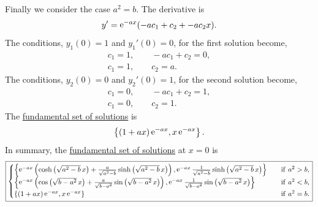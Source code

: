 \begin{Solution}
  Finally we consider the case $a^2 = b$.  The derivative is
  \[
  y' = \mathop{\mathrm{e}}\nolimits^{-a x} ( -a c_1 + c_2 + -a c_2 x ).
  \]
  The conditions, $y_1(0) = 1$ and $y_1'(0) = 0$, for the first solution become,
  \begin{gather*}
    c_1 = 1, \qquad -a c_1 + c_2 = 0, \\
    c_1 = 1, \qquad c_2 = a.
  \end{gather*}
  The conditions, $y_2(0) = 0$ and $y_2'(0) = 1$, for the second solution become,
  \begin{gather*}
    c_1 = 0, \qquad -a c_1 + c_2 = 1, \\
    c_1 = 0, \qquad c_2 = 1.
  \end{gather*}
  The 
  \hyperref[section The Fundamental Set of Solutions]
    {fundamental set of solutions}
  is
  \[
  \left\{
    (1 + a x) \mathop{\mathrm{e}}\nolimits^{-a x},
    x \mathop{\mathrm{e}}\nolimits^{-a x} 
  \right\}.
  \]
  In summary, the 
  \hyperref[section The Fundamental Set of Solutions]
    {fundamental set of solutions}
  at $x = 0$ is
  \[
  \boxed{
    \begin{cases}
      \left\{
        \mathop{\mathrm{e}}\nolimits^{-a x} \left( \cosh \left( \sqrt{a^2 - b}\, x \right) 
          + \frac{a}{\sqrt{a^2-b}} \sinh \left( \sqrt{a^2 - b}\, x \right)\right),
        \mathop{\mathrm{e}}\nolimits^{-a x} \frac{1}{\sqrt{a^2-b}} \sinh \left( \sqrt{a^2 - b}\, x\right)
      \right\}
      \quad &\mathrm{if}\ a^2 > b, \\
      \left\{
        \mathop{\mathrm{e}}\nolimits^{-a x} \left( \cos \left( \sqrt{b - a^2}\, x \right) 
          + \frac{a}{\sqrt{b-a^2}} \sin \left( \sqrt{b - a^2}\, x \right) \right),
        \mathop{\mathrm{e}}\nolimits^{-a x} \frac{1}{\sqrt{b-a^2}} \sin \left( \sqrt{b - a^2}\, x \right)
      \right\}
      \quad &\mathrm{if}\ a^2 < b, \\
      \left\{
        (1 + a x) \mathop{\mathrm{e}}\nolimits^{-a x},
        x \mathop{\mathrm{e}}\nolimits^{-a x} 
      \right\}
      \quad &\mathrm{if}\ a^2 = b. 
    \end{cases}
    }
  \]
\end{Solution}










